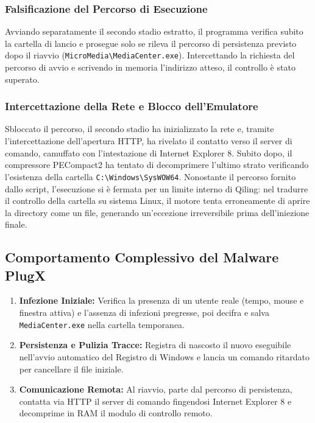 \documentclass[11pt, a4paper]{article}
\begin{document}
	\subsubsection{Falsificazione del Percorso di Esecuzione}
	
	Avviando separatamente il secondo stadio estratto, il programma verifica subito la cartella di lancio e prosegue solo se rileva il percorso di persistenza previsto dopo il riavvio (\texttt{MicroMedia\textbackslash MediaCenter.exe}). Intercettando la richiesta del percorso di avvio e scrivendo in memoria l'indirizzo atteso, il controllo è stato superato.
	
	\subsubsection{Intercettazione della Rete e Blocco dell'Emulatore}
	
	Sbloccato il percorso, il secondo stadio ha inizializzato la rete e, tramite l'intercettazione dell'apertura HTTP, ha rivelato il contatto verso il server di comando, camuffato con l'intestazione di Internet Explorer 8. Subito dopo, il compressore PECompact2 ha tentato di decomprimere l'ultimo strato verificando l'esistenza della cartella \texttt{C:\textbackslash Windows\textbackslash SysWOW64}. Nonostante il percorso fornito dallo script, l'esecuzione si è fermata per un limite interno di Qiling: nel tradurre il controllo della cartella su sistema Linux, il motore tenta erroneamente di aprire la directory come un file, generando un'eccezione irreversibile prima dell'iniezione finale.
	
	\subsection{Comportamento Complessivo del Malware PlugX}
	
	\begin{enumerate}
		\item \textbf{Infezione Iniziale:} Verifica la presenza di un utente reale (tempo, mouse e finestra attiva) e l'assenza di infezioni pregresse, poi decifra e salva \texttt{MediaCenter.exe} nella cartella temporanea.
		\item \textbf{Persistenza e Pulizia Tracce:} Registra di nascosto il nuovo eseguibile nell'avvio automatico del Registro di Windows e lancia un comando ritardato per cancellare il file iniziale.
		\item \textbf{Comunicazione Remota:} Al riavvio, parte dal percorso di persistenza, contatta via HTTP il server di comando fingendosi Internet Explorer 8 e decomprime in RAM il modulo di controllo remoto.
	\end{enumerate}
	
\end{document}
